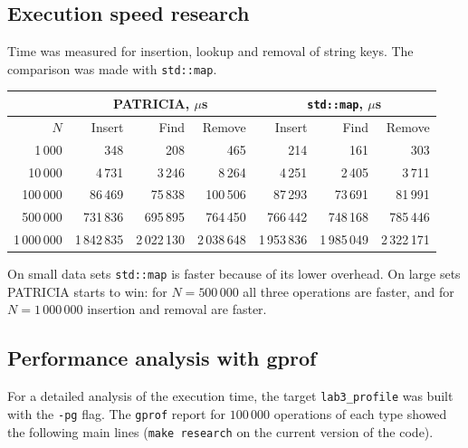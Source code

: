 \subsection{Execution speed research}

Time was measured for insertion, lookup and removal of string keys. The comparison was made with
\texttt{std::map}.

\begin{table}[!ht]
\centering
\begin{tabular}{|r|r|r|r|r|r|r|}
\hline
\rowcolor{lightgray}
& \multicolumn{3}{c|}{PATRICIA, $\mu$s} & \multicolumn{3}{c|}{\texttt{std::map}, $\mu$s} \\
\hline
\rowcolor{lightgray}
$N$ & Insert & Find & Remove & Insert & Find & Remove \\
\hline
1\,000 & 348 & 208 & 465 & 214 & 161 & 303 \\
\hline
10\,000 & 4\,731 & 3\,246 & 8\,264 & 4\,251 & 2\,405 & 3\,711 \\
\hline
100\,000 & 86\,469 & 75\,838 & 100\,506 & 87\,293 & 73\,691 & 81\,991 \\
\hline
500\,000 & 731\,836 & 695\,895 & 764\,450 & 766\,442 & 748\,168 & 785\,446 \\
\hline
1\,000\,000 & 1\,842\,835 & 2\,022\,130 & 2\,038\,648 & 1\,953\,836 & 1\,985\,049 & 2\,322\,171 \\
\hline
\end{tabular}
\end{table}

On small data sets \texttt{std::map} is faster because of its lower overhead. On large sets
PATRICIA starts to win: for $N=500\,000$ all three operations are faster, and for
$N=1\,000\,000$ insertion and removal are faster.

\subsection{Performance analysis with gprof}

For a detailed analysis of the execution time, the target \texttt{lab3\_profile} was built with the
\texttt{-pg} flag. The \texttt{gprof} report for $100\,000$ operations of each type showed the
following main lines (\texttt{make research} on the current version of the code).

